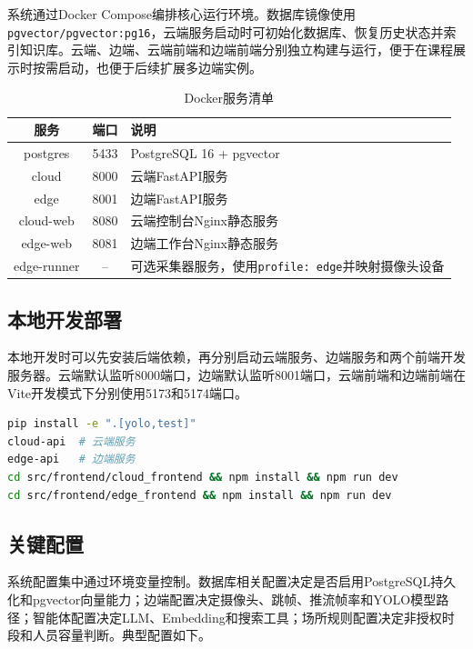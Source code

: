 系统通过Docker Compose编排核心运行环境。数据库镜像使用\verb|pgvector/pgvector:pg16|，云端服务启动时可初始化数据库、恢复历史状态并索引知识库。云端、边端、云端前端和边端前端分别独立构建与运行，便于在课程展示时按需启动，也便于后续扩展多边端实例。

\begin{table}[H]
\caption{Docker服务清单}
\begin{center}
\begin{tabular}{ccp{7.5cm}}
\toprule
服务        & 端口  & 说明 \\
\midrule
postgres    & 5433  & PostgreSQL 16 + pgvector \\
cloud       & 8000  & 云端FastAPI服务 \\
edge        & 8001  & 边端FastAPI服务 \\
cloud-web   & 8080  & 云端控制台Nginx静态服务 \\
edge-web    & 8081  & 边端工作台Nginx静态服务 \\
edge-runner & --    & 可选采集器服务，使用\verb|profile: edge|并映射摄像头设备 \\
\bottomrule
\end{tabular}
\end{center}
\label{tb:docker}
\end{table}

\subsection{本地开发部署}

本地开发时可以先安装后端依赖，再分别启动云端服务、边端服务和两个前端开发服务器。云端默认监听8000端口，边端默认监听8001端口，云端前端和边端前端在Vite开发模式下分别使用5173和5174端口。

\begin{lstlisting}[language=bash]
pip install -e ".[yolo,test]"
cloud-api  # 云端服务
edge-api   # 边端服务
cd src/frontend/cloud_frontend && npm install && npm run dev
cd src/frontend/edge_frontend && npm install && npm run dev
\end{lstlisting}

\subsection{关键配置}

系统配置集中通过环境变量控制。数据库相关配置决定是否启用PostgreSQL持久化和pgvector向量能力；边端配置决定摄像头、跳帧、推流帧率和YOLO模型路径；智能体配置决定LLM、Embedding和搜索工具；场所规则配置决定非授权时段和人员容量判断。典型配置如下。

